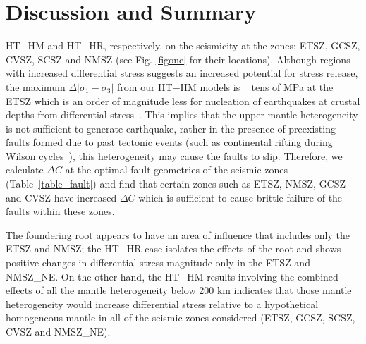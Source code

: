 \documentclass[draft,linenumbers]{agujournal2018}
\begin{document}
    
\section{Discussion and Summary}
    
    
    HT$-$HM and HT$-$HR, respectively, on the seismicity at the zones: ETSZ, GCSZ, CVSZ, SCSZ and NMSZ (see Fig. \ref{figone} for their locations). Although regions with increased differential stress suggests an increased potential for stress release, the maximum $\Delta|\sigma_1 - \sigma_3|$ from our HT$-$HM models is ~ tens of MPa at the ETSZ which is an order of magnitude less for nucleation of earthquakes at crustal depths from differential stress~\citep[e.g.][]{sibson1990rupture}. This implies that the upper mantle heterogeneity is not sufficient to generate earthquake, rather in the presence of preexisting faults formed due to past tectonic events (such as continental rifting during Wilson cycles~\citep{thomas2006tectonic}), this heterogeneity may cause the faults to slip. Therefore, we calculate $\Delta C$ at the optimal fault geometries of the seismic zones (Table~\ref{table_fault}) and find that certain zones such as ETSZ, NMSZ, GCSZ and CVSZ have increased $\Delta C$ which is sufficient to cause brittle failure of the faults within these zones.

     The foundering root appears to have an area of influence that includes only the ETSZ and NMSZ; the HT$-$HR case isolates the effects of the root and shows positive changes in differential stress magnitude only in the ETSZ and NMSZ\_NE. On the other hand, the HT$-$HM results involving the combined effects of all the mantle heterogeneity below 200 km indicates that those mantle heterogeneity would increase differential stress relative to a hypothetical homogeneous mantle in all of the seismic zones considered (ETSZ, GCSZ, SCSZ, CVSZ and NMSZ\_NE). 
     
\end{document}
